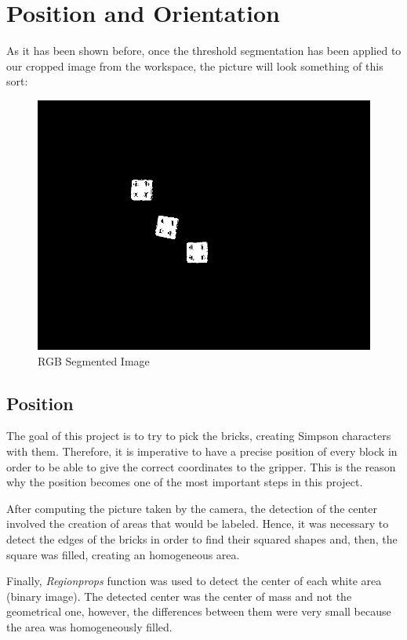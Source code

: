 \section{Position and Orientation}\label{ch:position_rotation}

As it has been shown before, once the threshold segmentation has been applied to our cropped image from the workspace, the picture will look something of this sort:

\begin{figure}[hb]
  \centering
  \includegraphics[scale=0.3]{figures/thresh_img.png}
  \caption[thresholded_image] {RGB Segmented Image}
\end{figure}

\subsection*{Position}
The goal of this project is to try to pick the bricks, creating Simpson characters with them. Therefore, it is imperative to have a precise position of every block in order to be able to give the correct coordinates to the gripper. This is the reason why the position becomes one of the most important steps in this project.

After computing the picture taken by the camera, the detection of the center involved the creation of areas that would be labeled. Hence, it was necessary to detect the edges of the bricks in order to find their squared shapes and, then, the square was filled, creating an homogeneous area.

Finally, \textit{Regionprops} function was used to detect the center of each white area (binary image). The detected center was the center of mass and not the geometrical one, however, the differences between them were very small because the area was homogeneously filled.


